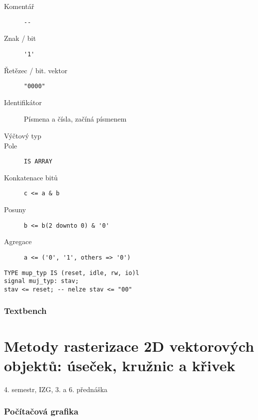 \documentclass[a4paper, 11pt]{report}
\begin{document}
\begin{description}
	\item[Komentář] \verb|--|
	\item[Znak / bit] \verb|'1'|
	\item[Řetězec / bit. vektor] \verb|"0000"|
	\item[Identifikátor] Písmena a čísla, začíná písmenem
	\item[Výčtový typ]
	\item[Pole] \verb|IS ARRAY|
	\item[Konkatenace bitů] \verb|c <= a & b|
	\item[Posuny] \verb|b <= b(2 downto 0) & '0'|
	\item[Agregace] \verb|a <= ('0', '1', others => '0')|
\end{description}

\begin{lstlisting}
TYPE mup_typ IS (reset, idle, rw, io)l
signal muj_typ: stav;
stav <= reset; -- nelze stav <= "00"
\end{lstlisting}

\subsection{Textbench}





























\chapter{Metody rasterizace 2D vektorových objektů: úseček, kružnic a křivek} \label{cha:11}

4. semestr, IZG, 3. a 6. přednáška


\subsection{Počítačová grafika}
\end{document}
